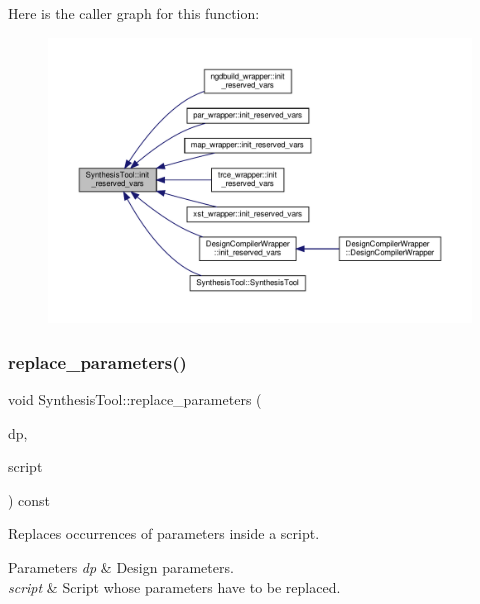 Here is the caller graph for this function\+:
\nopagebreak
\begin{figure}[H]
\begin{center}
\leavevmode
\includegraphics[width=350pt]{d9/de0/classSynthesisTool_a85b4a4fa0cc60e5325a79d7479c505b7_icgraph}
\end{center}
\end{figure}
\mbox{\label{classSynthesisTool_a96fbad52c8ebfe4b2685c2f47d824fa2}} 
\subsubsection{\texorpdfstring{replace\+\_\+parameters()}{replace\_parameters()}}
{\footnotesize\ttfamily void Synthesis\+Tool\+::replace\+\_\+parameters (\begin{DoxyParamCaption}\item[{const \hyperlink{DesignParameters_8hpp_ae36bb1c4c9150d0eeecfe1f96f42d157}{Design\+Parameters\+Ref} \&}]{dp,  }\item[{std\+::string \&}]{script }\end{DoxyParamCaption}) const}



Replaces occurrences of parameters inside a script. 


\begin{DoxyParams}{Parameters}
{\em dp} & Design parameters. \\
\hline
{\em script} & Script whose parameters have to be replaced. \\
\hline
\end{DoxyParams}


